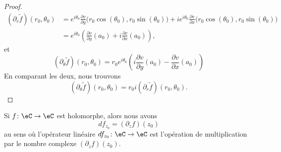\begin{proof}
	\begin{subequations}
		\begin{align}
			(\partial_r\tilde f)(r_0,\theta_0) & = e^{i\theta_0}\frac{ \partial v }{ \partial y}\big( r_0\cos(\theta_0),r_0\sin(\theta_0) \big)
			+i e^{i\theta_0}\frac{ \partial v }{ \partial x}\big( r_0\cos(\theta_0),r_0\sin(\theta_0) \big)                                                    \\
			                                   & = e^{i\theta_0}\left( \frac{ \partial v }{ \partial y }(a_0)+i\frac{ \partial v }{ \partial x }(a_0) \right),
		\end{align}
	\end{subequations}
	et
	\begin{equation}
		(\partial_{\theta}\tilde f)(r_0,\theta_0)=r_0 e^{i\theta_0}\left( i\frac{ \partial v }{ \partial y }(a_0)-\frac{ \partial v  }{ \partial x }(a_0) \right)
	\end{equation}
	En comparant les deux, nous trouvons
	\begin{equation}
		(\partial_{\theta}\tilde f)(r_0,\theta_0)=r_0i(\partial_r\tilde f)(r_0,\theta_0).
	\end{equation}
\end{proof}


\begin{proposition}     \label{PROPooCHUEooYsGcQK}
	Si \( f\colon \eC\to \eC\) est holomorphe, alors nous avons
	\begin{equation}
		df_{z_0}=(\partial_zf)(z_0)
	\end{equation}
	au sens où l'opérateur linéaire \( df_{z_0}\colon \eC\to \eC\) est l'opération de multiplication par le nombre complexe \( (\partial_zf)(z_0)\).
\end{proposition}

